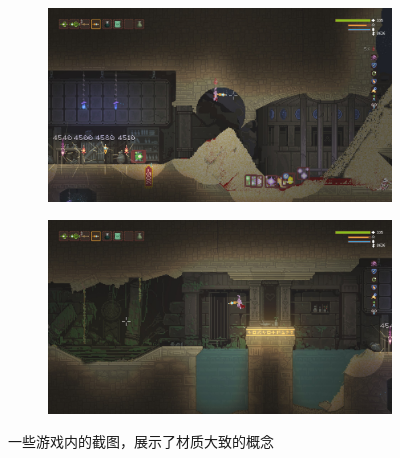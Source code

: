 \documentclass[11pt]{article}
\begin{document}
    \begin{figure}[ht]
        \begin{subfigure}{\textwidth}
            \centering
            \includegraphics[width=\textwidth]{./imgs/20210622001701_1}
            \caption{}
        \end{subfigure}
        \begin{subfigure}{\textwidth}
            \centering
            \includegraphics[width=\textwidth]{./imgs/20210622001712_1}
            \caption{}
        \end{subfigure}
        \caption{一些游戏内的截图，展示了材质大致的概念}
        \label{fig:texture-screenshots}
    \end{figure}
\end{document}

